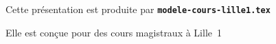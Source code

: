   \item Cette présentation est produite par \texttt{\textbf{modele-cours-lille1.tex}}
  \item Elle est conçue pour des cours magistraux à Lille~1
